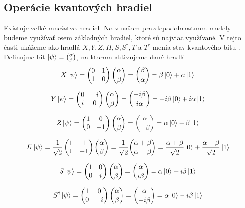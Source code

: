 \subsection{Operácie kvantových hradiel}
\label{op_kvan_hradiel}
Existuje veľké množstvo hradiel. No v našom pravdepodobnostnom modely budeme
využívať osem základných hradiel, ktoré sú najviac využívané. V tejto časti
ukážeme ako hradlá \(X, Y, Z, H, S, S^{\dag}, T\) a \(T^{\dag}\) menia stav
kvantového bitu \cite{Nie+00}. Definujme bit \(\ket{\psi} = \binom{\alpha}{\beta}\), na 
ktorom aktivujeme dané hradlá.
\[X\ket{\psi} = 
\begin{pmatrix}
0 & 1 \\
1 & 0 \\
\end{pmatrix}\binom{\alpha}{\beta} = \binom{\beta}{\alpha} = \beta\ket{0} + \alpha\ket{1}\]

\[Y\ket{\psi} = 
\begin{pmatrix}
0 & -i \\
i & 0 \\
\end{pmatrix}\binom{\alpha}{\beta} = \binom{-i\beta}{i\alpha} = -i\beta\ket{0} + i\alpha\ket{1}\]

\[Z\ket{\psi} = 
\begin{pmatrix}
1 & 0 \\
0 & -1 \\
\end{pmatrix}\binom{\alpha}{\beta} = \binom{\alpha}{-\beta} = \alpha\ket{0} - \beta\ket{1}\]

\[H\ket{\psi} = \frac{1}{\sqrt{2}}
\begin{pmatrix}
1 & 1 \\
1 & -1 \\
\end{pmatrix}\binom{\alpha}{\beta} = \frac{1}{\sqrt{2}}\binom{\alpha + \beta}{\alpha - \beta} = \frac{\alpha + \beta}{\sqrt{2}}\ket{0} + \frac{\alpha - \beta}{\sqrt{2}}\ket{1}\]

\[S\ket{\psi} = 
\begin{pmatrix}
1 & 0 \\
0 & i \\
\end{pmatrix}\binom{\alpha}{\beta} = \binom{\alpha}{i\beta} = \alpha\ket{0} + i\beta\ket{1}\]

\[S^{\dag}\ket{\psi} = 
\begin{pmatrix}
1 & 0 \\
0 & -i \\
\end{pmatrix}\binom{\alpha}{\beta} = \binom{\alpha}{-i\beta} = \alpha\ket{0} - i\beta\ket{1}\]

